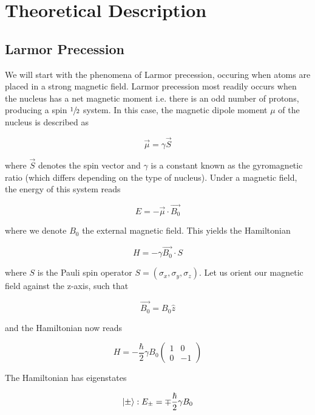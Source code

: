 \documentclass[%
 reprint,
 amsmath,amssymb,
 aps,
]{revtex4-2}
\DeclarePairedDelimiter\ket{\lvert}{\rangle}
\newcommand{\half}{$\sfrac{1}{2}$ }
\newcommand{\pauliz}{\begin{pmatrix}
                    1 & 0 \\
                    0 & -1 
                    \end{pmatrix}}
\begin{document}
\section{\label{sec:theroy} Theoretical Description}

\subsection{\label{subsec:larmor} Larmor Precession}

We will start with the phenomena of Larmor precession, occuring when atoms are placed in a strong magnetic field. Larmor precession most readily occurs when the nucleus has a net magnetic moment i.e. there is an odd number of protons, producing a spin \half  system. In this case, the magnetic dipole moment $\mu$ of the nucleus is described as 

\begin{equation}
    \vec{\mu} = \gamma \vec{S}
\end{equation}

where $\vec{S}$ denotes the spin vector and $\gamma$ is a constant known as the gyromagnetic ratio (which differs depending on the type of nucleus). Under a magnetic field, the energy of this system reads 

\begin{equation}
    E = -\vec{\mu} \cdot \vec{B_0}
\end{equation}

where we denote $B_0$ the external magnetic field. This yields the Hamiltonian 

\begin{equation}\label{eqn:base-hamiltonian}
    H = -\gamma \vec{B_0} \cdot S
\end{equation}

where $S$ is the Pauli spin operator $S = (\sigma_x, \sigma_y, \sigma_z)$. Let us orient our magnetic field against the z-axis, such that 

\begin{equation}
    \vec{B_0} = B_0 \hat{z} 
\end{equation}

and the Hamiltonian now reads

\begin{equation}\label{eqn:hamiltonian}
    H = -\frac{\hbar}{2} \gamma B_0  \pauliz
\end{equation}

The Hamiltonian has eigenstates

\begin{equation}
    \ket{\pm} : E_\pm = \mp \frac{\hbar}{2} \gamma B_0 
\end{equation}
\end{document}
